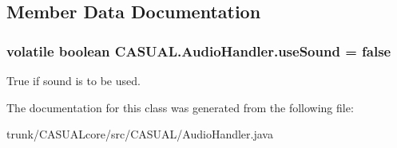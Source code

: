 \subsection{Member Data Documentation}
\hypertarget{class_c_a_s_u_a_l_1_1_audio_handler_ad7986b266c595310fa3ad7167d690594}{
\subsubsection[{use\-Sound}]{\setlength{\rightskip}{0pt plus 5cm}volatile boolean C\-A\-S\-U\-A\-L.\-Audio\-Handler.\-use\-Sound = false\hspace{0.3cm}{\ttfamily [static]}}}\label{class_c_a_s_u_a_l_1_1_audio_handler_ad7986b266c595310fa3ad7167d690594}
True if sound is to be used. 

The documentation for this class was generated from the following file\-:\begin{DoxyCompactItemize}
\item 
trunk/\-C\-A\-S\-U\-A\-Lcore/src/\-C\-A\-S\-U\-A\-L/Audio\-Handler.\-java\end{DoxyCompactItemize}
